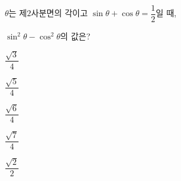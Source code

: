 $\theta$는 제$2$사분면의 각이고 $\sin\theta+\cos\theta=\dfrac{1}{2}$일 때,\par\noindent $\sin^2\theta-\cos^2\theta$의 값은?
\begin{choices32}{\rule[-3ex]{0pt}{8ex}$\dfrac{\sqrt{3}}{4}$}{\rule[-3ex]{0pt}{8ex}$\dfrac{\sqrt{5}}{4}$}{\rule[-3ex]{0pt}{8ex}$\dfrac{\sqrt{6}}{4}$}{\rule[-3ex]{0pt}{8ex}$\dfrac{\sqrt{7}}{4}$}{\rule[-3ex]{0pt}{8ex}$\dfrac{\sqrt{2}}{2}$}\end{choices32}
